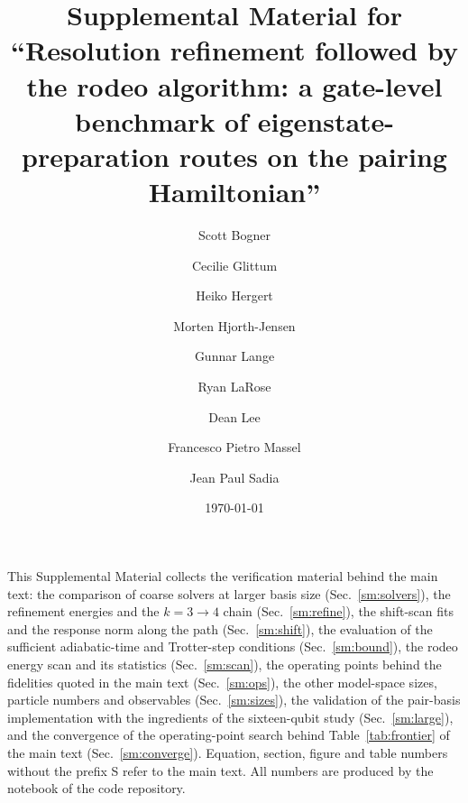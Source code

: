 \documentclass[aps,prc,reprint,superscriptaddress,floatfix,nofootinbib]{revtex4-2}
\begin{document}
\title{Supplemental Material for ``Resolution refinement followed by the
rodeo algorithm: a gate-level benchmark of eigenstate-preparation routes on
the pairing Hamiltonian''}
\author{Scott Bogner}
\author{Cecilie Glittum}
\author{Heiko Hergert}
\author{Morten Hjorth-Jensen}
\author{Gunnar Lange}
\author{Ryan LaRose}
\author{Dean Lee}
\author{Francesco Pietro Massel}
\author{Jean Paul Sadia}
\date{\today}
\maketitle


This Supplemental Material collects the verification material behind the
main text: the comparison of coarse solvers at larger basis size
(Sec.~\ref{sm:solvers}), the refinement energies and the $k=3\to4$ chain
(Sec.~\ref{sm:refine}), the shift-scan fits and the response norm along the
path (Sec.~\ref{sm:shift}), the evaluation of the sufficient adiabatic-time
and Trotter-step conditions (Sec.~\ref{sm:bound}), the rodeo energy scan
and its statistics (Sec.~\ref{sm:scan}), the operating points behind the
fidelities quoted in the main text (Sec.~\ref{sm:ops}), the other
model-space sizes, particle numbers and observables (Sec.~\ref{sm:sizes}),
the validation of the pair-basis implementation with the ingredients
of the sixteen-qubit study (Sec.~\ref{sm:large}), and the convergence of
the operating-point search behind Table~\ref{tab:frontier} of the main
text (Sec.~\ref{sm:converge}).  Equation, section,
figure and table numbers without the prefix S refer to the main text.
All numbers are produced by the notebook of the code repository.
\end{document}
